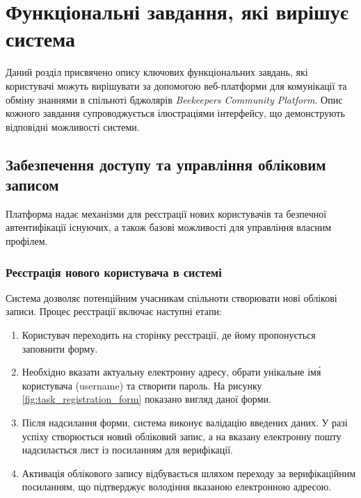 \chapter{Функціональні завдання, які вирішує система}
\label{ch:functional_tasks}

Даний розділ присвячено опису ключових функціональних завдань, які користувачі можуть вирішувати за допомогою веб-платформи для комунікації та обміну знаннями в спільноті бджолярів \textit{Beekeepers Community Platform}. Опис кожного завдання супроводжується ілюстраціями інтерфейсу, що демонструють відповідні можливості системи.

\section{Забезпечення доступу та управління обліковим записом}
\label{sec:tasks_auth}
Платформа надає механізми для реєстрації нових користувачів та безпечної автентифікації існуючих, а також базові можливості для управління власним профілем.

\subsection{Реєстрація нового користувача в системі}
\label{subsec:task_registration}
Система дозволяє потенційним учасникам спільноти створювати нові облікові записи. Процес реєстрації включає наступні етапи:
\begin{enumerate}
    \item Користувач переходить на сторінку реєстрації, де йому пропонується заповнити форму.
    \item Необхідно вказати актуальну електронну адресу, обрати унікальне ім\'я користувача (username) та створити пароль. На рисунку \ref{fig:task_registration_form} показано вигляд даної форми.
    \item Після надсилання форми, система виконує валідацію введених даних. У разі успіху створюється новий обліковий запис, а на вказану електронну пошту надсилається лист із посиланням для верифікації.
    \item Активація облікового запису відбувається шляхом переходу за верифікаційним посиланням, що підтверджує володіння вказаною електронною адресою.
\end{enumerate}

